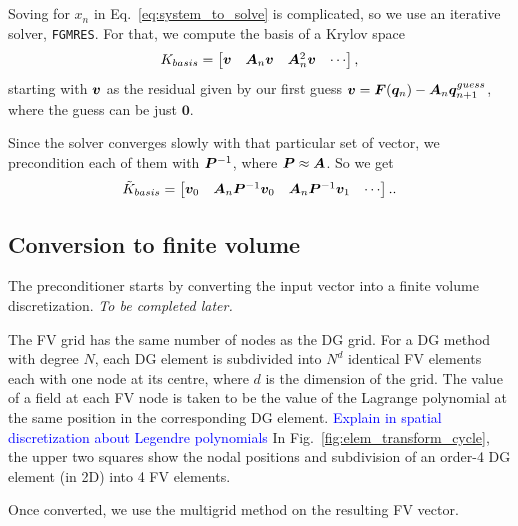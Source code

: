 \documentclass{article}
\newcommand{\todo}[1]{\textcolor{blue}{#1}}
\begin{document}
\subsection{\fgmres}\label{sec:fgmres}

Soving for $x_n$ in Eq.~\ref{eq:system_to_solve} is complicated, so we use an iterative solver, \texttt{FGMRES}.
For that, we compute the basis of a Krylov space
$$K_{basis} = \left[\begin{matrix} \bm{v} & \bm{A}_n\bm{v} & \bm{A}_n^2 \bm{v} & \cdots \end{matrix}\right],$$
 starting with $\bm{v}$ as the residual given by our first guess
$\bm{v} = \bm{F}(\bm{q}_{n}) - \bm{A}_n \bm{q}_{n+1}^{guess}$, where the guess can be just $\bm{0}$.

Since the solver converges slowly with that particular set of vector, we precondition each of them
with $\bm{P}^{-1}$, where $\bm{P}\approx\bm{A}$.
So we get 
\begin{equation}
\tilde{K}_{basis} = \left[\begin{matrix}
    \bm{v}_0 &
    \bm{A}_n\bm{P}^{-1}\bm{v}_0 &
    \bm{A}_n\bm{P}^{-1}\bm{v}_1 & \cdots \end{matrix}\right].
    \text{.}
\end{equation}


\subsection{Conversion to finite volume}\label{sec:finite_volume}

The \fgmres{} preconditioner starts by converting the input vector into a finite volume discretization. \emph{To be completed later.}

The FV grid has the same number of nodes as the DG grid.
For a DG method with degree $N$, each DG element is subdivided into $N^d$ identical
FV elements each with one node at its centre, where $d$ is the dimension of the grid. 
The value of a field at each FV node is taken to be the value of the Lagrange 
polynomial at the same position in the corresponding DG element.
\todo{Explain in spatial discretization about Legendre polynomials}
In Fig.~\ref{fig:elem_transform_cycle}, the upper two squares show the nodal positions
and subdivision of an order-4 DG element (in 2D) into 4 FV elements.

Once converted, we use the multigrid method on the resulting FV vector.
\end{document}
